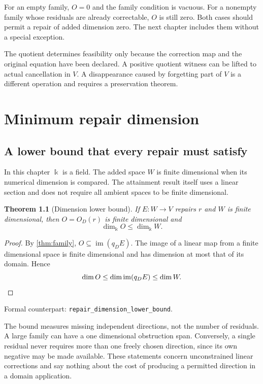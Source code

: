 \documentclass[11pt,letterpaper,oneside,openany]{book}
\theoremstyle{quiet}
\newtheorem{theorem}{Theorem}[chapter]
\newcommand{\kk}{\Bbbk}
\DeclareMathOperator{\im}{im}
\newcommand{\formal}[1]{\par\nobreak\begingroup\footnotesize\color{Slate}\sffamily Formal counterpart: \normalfont\nolinkurl{#1}.\par\endgroup}
\begin{document}
For an empty family, $O=0$ and the family condition is vacuous. For a nonempty family whose residuals are already correctable, $O$ is still zero. Both cases should permit a repair of added dimension zero. The next chapter includes them without a special exception.

\begin{scopebox}[title=What has been established]
The quotient determines feasibility only because the correction map and the original equation have been declared. A positive quotient witness can be lifted to actual cancellation in $V$. A disappearance caused by forgetting part of $V$ is a different operation and requires a preservation theorem.
\end{scopebox}

\chapter{Minimum repair dimension}\label{ch:minimal}
\section{A lower bound that every repair must satisfy}
In this chapter $\kk$ is a field. The added space $W$ is finite dimensional when its numerical dimension is compared. The attainment result itself uses a linear section and does not require all ambient spaces to be finite dimensional.

\begin{theorem}[Dimension lower bound]\label{thm:lower}
If $E:W\to V$ repairs $r$ and $W$ is finite dimensional, then $O=O_D(r)$ is finite dimensional and
\[
\dim_{\kk}O\leq\dim_{\kk}W.
\]
\end{theorem}
\begin{proof}
By \cref{thm:family}, $O\subseteq\im(q_DE)$. The image of a linear map from a finite dimensional space is finite dimensional and has dimension at most that of its domain. Hence
\[
\dim O\leq\dim\im(q_DE)\leq\dim W.\qedhere
\]
\end{proof}
\formal{repair_dimension_lower_bound}

The bound measures missing independent directions, not the number of residuals. A large family can have a one dimensional obstruction span. Conversely, a single residual never requires more than one freely chosen direction, since its own negative may be made available. These statements concern unconstrained linear corrections and say nothing about the cost of producing a permitted direction in a domain application.
\end{document}
